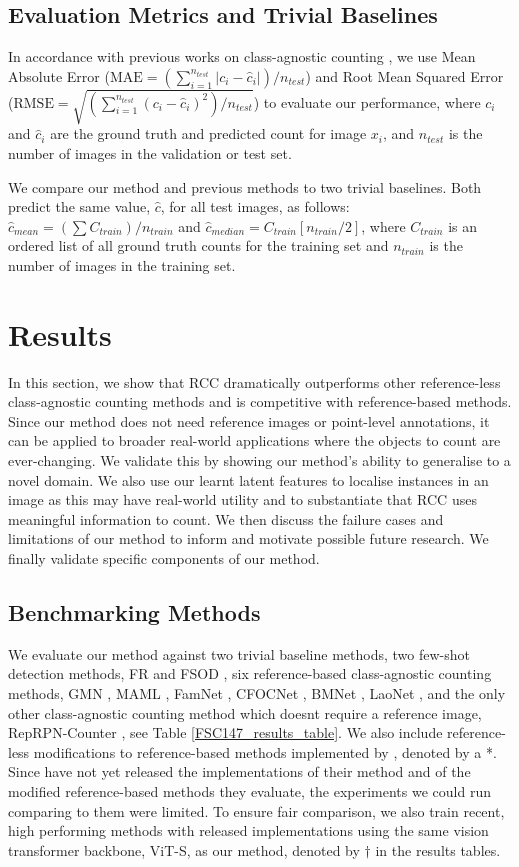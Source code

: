\documentclass[letterpaper, 11pt]{IEEEtran}
\begin{document}
\subsection{Evaluation Metrics and Trivial Baselines}
\label{experiments_evaluationmetrics}
In accordance with previous works on class-agnostic counting \cite{shi2022represent, ranjan2022exemplar}, we use Mean Absolute Error ($\text{MAE} = (\sum_{i=1}^{n_{test}} |c_i - \hat{c}_i|)/n_{test}  $) and Root Mean Squared Error ($\text{RMSE} = \sqrt{(\sum_{i=1}^{n_{test}} (c_i - \hat{c}_i)^2)/n_{test}}$) to evaluate our performance, 
where $c_i$ and $\hat{c}_i$ are the ground truth and predicted count for image $x_i$, and $n_{test}$ is the number of images in the validation or test set.

We compare our method and previous methods to two trivial baselines. Both predict the same value, $\hat{c}$, for all test images, as follows: $\hat{c}_{mean} =(\sum C_{train})/n_{train}$ and $\hat{c}_{median} = C_{train}[n_{train}/2]$, 
where $C_{train}$ is an ordered list of all ground truth counts for the training set and $n_{train}$ is the number of images in the training set.
\section{Results}
In this section, we show that RCC dramatically outperforms other reference-less class-agnostic counting methods and is competitive with reference-based methods. Since our method does not need reference images or point-level annotations, it can be applied to broader real-world applications where the objects to count are ever-changing. We validate this by showing our method's ability to generalise to a novel domain. 
We also use our learnt latent features to localise instances in an image as this may have real-world utility and to substantiate that RCC uses meaningful information to count. We then discuss the failure cases and limitations of our method to inform and motivate possible future research. We finally validate specific components of our method.
\subsection{Benchmarking Methods}
We evaluate our method against two trivial baseline methods, two few-shot detection methods, FR \cite{kang2019few} and FSOD \cite{fan2020few},  six reference-based class-agnostic counting methods, GMN \cite{Lu18}, MAML \cite{finn2017model}, FamNet \cite{ranjan2021Famnet}, CFOCNet  \cite{yang2021cfoc}, BMNet \cite{shi2022represent}, LaoNet \cite{lin2021object}, and the only other  class-agnostic counting method which doesnt require a reference image, RepRPN-Counter \cite{ranjan2022exemplar}, see Table \ref{FSC147_results_table}. We also include reference-less modifications to reference-based methods implemented by \citet{ranjan2022exemplar}, denoted by a *. 
Since \citet{ranjan2022exemplar} have not yet released the implementations of their method and of the modified reference-based methods they evaluate, the experiments we could run comparing to them were limited.
To ensure fair comparison, we also train recent, high performing methods with released implementations using the same vision transformer backbone, ViT-S, as our method, denoted by $\dag$ in the results tables.
\end{document}
